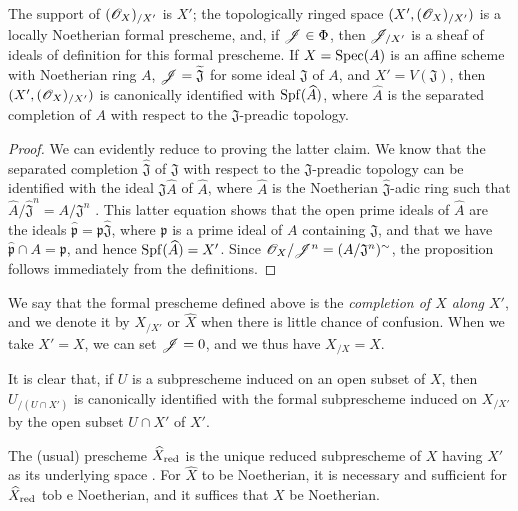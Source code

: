 \begin{proposition}[10.8.5]
\label{I.10.8.5}
The support of $(\mathscr{O}_X)_{/X'}$ is $X'$; the topologically ringed space $(X',(\mathscr{O}_X)_{/X'})$ is a locally Noetherian formal prescheme, and, if $\mathscr{J}\in\Phi$, then $\mathscr{J}_{/X'}$ is a sheaf of ideals of definition for this formal prescheme.
If $X=\operatorname{Spec}(A)$ is an affine scheme with Noetherian ring $A$, $\mathscr{J}=\widetilde{\mathfrak{J}}$ for some ideal $\mathfrak{J}$ of $A$, and $X'=V(\mathfrak{J})$, then $(X',(\mathscr{O}_X)_{/X'})$ is canonically identified with $\operatorname{Spf}(\widehat{A})$, where $\widehat{A}$ is the separated completion of $A$ with respect to the $\mathfrak{J}$-preadic topology.
\end{proposition}

\begin{proof}
We can evidently reduce to proving the latter claim.
We know  that the separated completion $\widehat{\mathfrak{J}}$ of $\mathfrak{J}$ with respect to the $\mathfrak{J}$-preadic topology can be identified with the ideal $\mathfrak{J}\widehat{A}$ of $\widehat{A}$, where $\widehat{A}$ is the Noetherian $\widehat{\mathfrak{J}}$-adic ring such that $\widehat{A}/\widehat{\mathfrak{J}}^n=A/\mathfrak{J}^n$ .
This latter equation shows that the open prime ideals of $\widehat{A}$ are the ideals $\widehat{\mathfrak{p}}=\mathfrak{p}\widehat{\mathfrak{J}}$, where $\mathfrak{p}$ is a prime ideal of $A$ containing $\mathfrak{J}$, and that we have $\widehat{\mathfrak{p}}\cap A=\mathfrak{p}$, and hence $\operatorname{Spf}(\widehat{A})=X'$.
Since $\mathscr{O}_X/\mathscr{J}^n=(A/\mathfrak{J}^n)^\sim$, the proposition follows immediately from the definitions.
\end{proof}

We say that the formal prescheme defined above is the \emph{completion of $X$ along $X'$}, and we denote it by $X_{/X'}$ or $\widehat{X}$ when there is little chance of confusion.
When we take $X'=X$, we can set $\mathscr{J}=0$, and we thus have $X_{/X}=X$.

It is clear that, if $U$ is a subprescheme induced on an open subset of $X$, then $U_{/(U\cap X')}$ is canonically identified with the formal subprescheme induced on $X_{/X'}$ by the open subset $U\cap X'$ of $X'$.

\begin{corollary}[10.8.6]
\label{I.10.8.6}
The (usual) prescheme $\widehat{X}_{\mathrm{red}}$ is the unique reduced subprescheme of $X$ having $X'$ as its underlying space .
For $\widehat{X}$ to be Noetherian, it is necessary and sufficient for $\widehat{X}_{\mathrm{red}}$ tob e Noetherian, and it suffices that $X$ be Noetherian.
\end{corollary}

